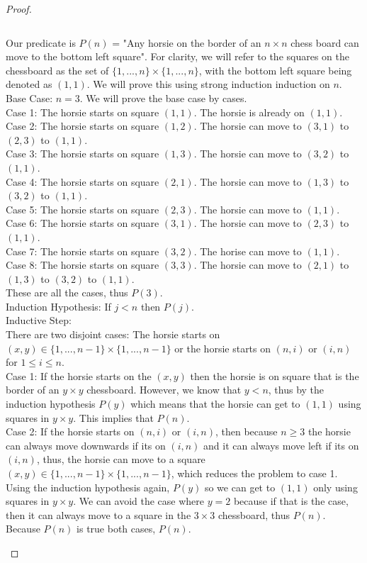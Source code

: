 \documentclass[11pt]{article}
\newenvironment{myproof}
{\begin{proof} \begin{adjustwidth}{3em}{0pt}$ $\par\nobreak\ignorespaces}
{\end{adjustwidth} \end{proof}}
\begin{document}
\begin{flushleft}
\begin{myproof}
Our predicate is $P(n)$ = "Any horsie on the border of an $n \times n$ chess board can move to the bottom left square". For clarity, we will refer to the squares on the chessboard as the set of $\{1,...,n\} \times \{1,...,n\}$, with the bottom left square being denoted as $(1,1)$.
We will prove this using strong induction induction on $n$. \\
\bigskip
Base Case: $n = 3$. We will prove the base case by cases. \\
Case 1: The horsie starts on square $(1,1)$. The horsie is already on $(1,1)$. \\
Case 2: The horsie starts on square $(1,2)$. The horsie can move to $(3,1)$ to $(2,3)$ to $(1,1)$. \\
Case 3: The horsie starts on square $(1,3)$. The horsie can move to $(3,2)$ to $(1,1)$. \\
Case 4: The horsie starts on square $(2,1)$. The horsie can move to $(1,3)$ to $(3,2)$ to $(1,1)$. \\
Case 5: The horsie starts on square $(2,3)$. The horsie can move to $(1,1)$. \\
Case 6: The horsie starts on square $(3,1)$. The horsie can move to $(2,3)$ to $(1,1)$. \\
Case 7: The horsie starts on square $(3,2)$. The horise can move to $(1,1)$. \\
Case 8: The horsie starts on square $(3,3)$. The horsie can move to $(2,1)$ to $(1,3)$ to $(3,2)$ to $(1,1)$. \\
\bigskip
These are all the cases, thus $P(3)$. \\
\bigskip
Induction Hypothesis: If $j < n$ then $P(j)$. \\
\bigskip
Inductive Step: \\

There are two disjoint cases: The horsie starts on $(x,y) \in \{1,...,n-1\} \times \{1,...,n-1\}$ or the horsie starts on $(n,i)$ or $(i,n)$ for $1 \leq i \leq n$. \\
\bigskip
Case 1: If the horsie starts on the $(x,y)$ then the horsie is on square that is the border of an $y \times y$ chessboard. However, we know that $y < n$, thus by the induction hypothesis $P(y)$ which means that the horsie can get to $(1,1)$ using squares in $y \times y$. This implies that $P(n)$. \\
Case 2: If the horsie starts on $(n,i)$ or $(i,n)$, then because $n \geq 3$ the horsie can always move downwards if its on $(i,n)$ and it can always move left if its on $(i,n)$, thus, the horsie can move to  a square $(x,y) \in \{1,...,n-1\} \times \{1,...,n-1\}$, which reduces the problem to case 1. Using the induction hypothesis again, $P(y)$ so we can get to $(1,1)$ only using squares in $y \times y$. We can avoid the case where $y=2$ because if that is the case, then it can always move to a square in the $3 \times 3$ chessboard, thus $P(n)$. \\
\bigskip
Because $P(n)$ is true both cases, $P(n)$.


\end{myproof}
\end{flushleft}
\end{document}
